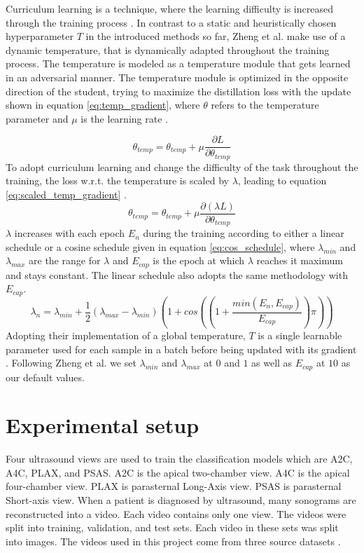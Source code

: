 \documentclass[11pt]{article}
\begin{document}
Curriculum learning is a technique, where the learning difficulty is increased through the training process \cite{liCurriculumTemperatureKnowledge2022}. In contrast to a static and heuristically chosen hyperparameter $ T $ in the introduced methods so far, Zheng et al. make use of a dynamic temperature, that is dynamically adapted throughout the training process. The temperature is modeled as a temperature module that gets learned in an adversarial manner. The temperature module is optimized in the opposite direction of the student, trying to maximize the distillation loss with the update shown in equation \ref{eq:temp_gradient}, where $ \theta $ refers to the temperature parameter and $ \mu $ is the learning rate \cite{liCurriculumTemperatureKnowledge2022}.


\begin{equation}
\label{eq:temp_gradient}
\theta_{temp} = \theta_{temp} + \mu \frac{\partial L}{\partial \theta_{temp}}
\end{equation}
To adopt curriculum learning and change the difficulty of the task throughout the training, the loss w.r.t. the temperature is scaled by $ \lambda $, leading to equation \ref{eq:scaled_temp_gradient} \cite{liCurriculumTemperatureKnowledge2022}.
\begin{equation}
\label{eq:scaled_temp_gradient}
\theta_{temp} = \theta_{temp} + \mu \frac{\partial(\lambda L)}{\partial \theta_{temp}}
\end{equation}
$ \lambda $ increases with each epoch $ E_n $ during the training according to either a linear schedule or a cosine schedule given in equation \ref{eq:cos_schedule}, where $  \lambda_{min} $ and $  \lambda_{max} $ are the range for $ \lambda $ and $ E_{cap} $ is the epoch at which $ \lambda $ reaches it maximum and stays constant. The linear schedule also adopts the same methodology with $ E_{cap} $.
\begin{equation}
\label{eq:cos_schedule}
\lambda_{n} = \lambda_{min} + \frac{1}{2}(\lambda_{max}-\lambda_{min})(1 + cos((1+\frac{min(E_n, E_{cap})}{E_{cap}})\pi))
\end{equation}
Adopting their implementation of a global temperature, $ T $ is a single learnable parameter used for each sample in a batch before being updated with its gradient \cite{liCurriculumTemperatureKnowledge2022}. Following Zheng et al. we set $  \lambda_{min} $ and $  \lambda_{max} $ at $ 0 $ and $ 1 $ as well as $ E_{cap} $ at $ 10 $ as our default values.

\section{Experimental setup}
Four ultrasound views are used to train the classification models which are A2C, A4C, PLAX, and PSAS. A2C is the apical two-chamber view. A4C is the apical four-chamber view. PLAX is parasternal Long-Axis view. PSAS is parasternal Short-axis view. When a patient is diagnosed by ultrasound, many sonograms are reconstructed into a video. Each video contains only one view. The videos were split into training, validation, and test sets. Each video in these sets was split into images. The videos used in this project come from three source datasets \cite{EchoNetDynamic}\cite{EchoNetLVH}\cite{Tufts}.
\end{document}
